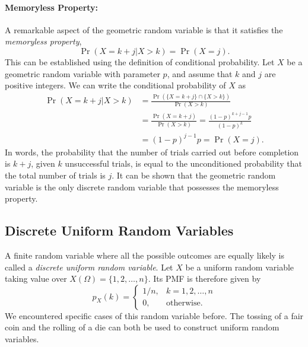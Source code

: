 \paragraph{Memoryless Property:}
A remarkable aspect of the geometric random variable is that it satisfies the \emph{memoryless property}, 
\begin{equation*}
\Pr (X = k + j | X > k) = \Pr (X = j).
\end{equation*}
This can be established using the definition of conditional probability.
Let $X$ be a geometric random variable with parameter $p$, and assume that $k$ and $j$ are positive integers.
We can write the conditional probability of $X$ as
\begin{equation*}
\begin{split}
\Pr (X = k + j | X > k)
&= \frac{\Pr( \{ X =  k + j \} \cap \{ X > k \} ) }{ \Pr ( X > k ) } \\
&= \frac{\Pr( X = k + j ) }{ \Pr ( X > k ) }
= \frac{(1 - p)^{k + j - 1} p }{ (1 - p)^k  } \\
&= (1 - p)^{j - 1} p
= \Pr (X = j).
\end{split}
\end{equation*}
In words, the probability that the number of trials carried out before completion is $k + j$, given $k$ unsuccessful trials, is equal to the unconditioned probability that the total number of trials is $j$.
It can be shown that the geometric random variable is the only discrete random variable that possesses the memoryless property.


\subsection{Discrete Uniform Random Variables}

A finite random variable where all the possible outcomes are equally likely is called a \emph{discrete uniform random variable}. 
Let $X$ be a uniform random variable taking value over $X (\Omega) = \{ 1, 2, \ldots, n \}$.
Its PMF is therefore given by
\begin{equation*}
p_X (k) = \begin{cases}
1/n, & k = 1, 2, \ldots, n \\
0, & \text{otherwise} .
\end{cases}
\end{equation*}
We encountered specific cases of this random variable before.
The tossing of a fair coin and the rolling of a die can both be used to construct uniform random variables.

